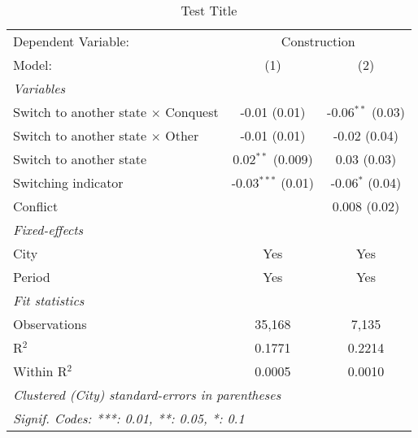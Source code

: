 \begin{table}[htbp]
   \caption{\label{tab:baseline_10y} Test Title}
   \centering
   \begin{tabular}{lcc}
      \tabularnewline \midrule \midrule
      Dependent Variable: & \multicolumn{2}{c}{Construction}\\
      Model:                                     & (1)                  & (2)\\  
      \midrule
      \emph{Variables}\\
      Switch to another state $\times$ Conquest  & -0.01 (0.01)         & -0.06$^{**}$ (0.03)\\   
      Switch to another state $\times$ Other     & -0.01 (0.01)         & -0.02 (0.04)\\   
      Switch to another state                    & 0.02$^{**}$ (0.009)  & 0.03 (0.03)\\   
      Switching indicator                        & -0.03$^{***}$ (0.01) & -0.06$^{*}$ (0.04)\\   
      Conflict                                   &                      & 0.008 (0.02)\\   
      \midrule
      \emph{Fixed-effects}\\
      City                                       & Yes                  & Yes\\  
      Period                                     & Yes                  & Yes\\  
      \midrule
      \emph{Fit statistics}\\
      Observations                               & 35,168               & 7,135\\  
      R$^2$                                      & 0.1771               & 0.2214\\  
      Within R$^2$                               & 0.0005               & 0.0010\\  
      \midrule \midrule
      \multicolumn{3}{l}{\emph{Clustered (City) standard-errors in parentheses}}\\
      \multicolumn{3}{l}{\emph{Signif. Codes: ***: 0.01, **: 0.05, *: 0.1}}\\
   \end{tabular}
\end{table}
